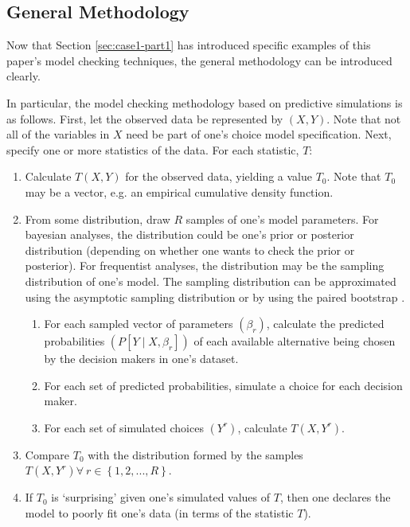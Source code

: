 \documentclass[preprint]{elsarticle}
\begin{document}
\subsection{General Methodology}
\label{sec:general-methodology}
Now that Section \ref{sec:case1-part1} has introduced specific examples of this paper's model checking techniques, the general methodology can be introduced clearly.

In particular, the model checking methodology based on predictive simulations is as follows. First, let the observed data be represented by $\left( X, Y \right)$. Note that not all of the variables in $X$ need be part of one's choice model specification. Next, specify one or more statistics of the data. For each statistic, $T$:
\begin{enumerate}
\item Calculate $T \left( X, Y \right)$ for the observed data, yielding a value $T_0$. Note that $T_0$ may be a vector, e.g. an empirical cumulative density function.

\item From some distribution, draw $R$ samples of one's model parameters. For bayesian analyses, the distribution could be one's prior or posterior distribution (depending on whether one wants to check the prior or posterior). For frequentist analyses, the distribution may be the sampling distribution of one's model. The sampling distribution can be approximated using the asymptotic sampling distribution or by using the paired bootstrap \citep{brownstone_bootstrap_2001}.

	\begin{enumerate}
		\item For each sampled vector of parameters $\left( \beta _r \right)$, calculate the predicted probabilities $\left( P \left[ Y \mid X, \beta_r \right] \right)$ of each available alternative being chosen by the decision makers in one's dataset.

		\item For each set of predicted probabilities, simulate a choice for each decision maker.

		\item For each set of simulated choices $\left( Y^r \right)$, calculate $T \left( X, Y^r \right)$.
	\end{enumerate}

\item Compare $T_0$ with the distribution formed by the samples $T \left( X, Y^r \right) \forall \  r \in \left\lbrace 1, 2, ..., R \right\rbrace$.

\item If $T_0$ is `surprising' given one's simulated values of $T$, then one declares the model to poorly fit one's data (in terms of the statistic $T$).
\end{enumerate}
\end{document}
